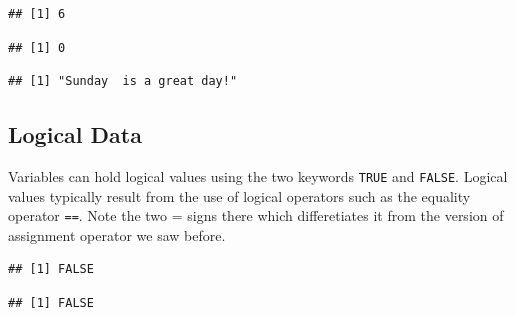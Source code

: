 \documentclass[10pt, letterpaper, twoside]{memoir}\usepackage{knitr}
\begin{document}
\begin{knitrout}
\color{fgcolor}\begin{kframe}
\begin{alltt}
\end{alltt}
\begin{verbatim}
## [1] 6
\end{verbatim}
\begin{alltt}
\end{alltt}
\begin{verbatim}
## [1] 0
\end{verbatim}
\begin{alltt}
 \hlkwb{<-}  \hlstd{)}
\end{alltt}
\begin{verbatim}
## [1] "Sunday  is a great day!"
\end{verbatim}
\end{kframe}
\end{knitrout}

\subsection{Logical Data}

Variables can hold logical values using the two keywords \texttt{TRUE} and \texttt{FALSE}.  Logical values typically result from the use of logical operators such as the equality operator \texttt{==}. Note the two = signs there which differetiates it from the version of assignment operator we saw before.

\begin{knitrout}
\color{fgcolor}\begin{kframe}
\begin{alltt}
 \hlopt{==}   
\end{alltt}
\begin{verbatim}
## [1] FALSE
\end{verbatim}
\begin{alltt}
 \hlopt{==}   
\end{alltt}
\begin{verbatim}
## [1] FALSE
\end{verbatim}
\end{kframe}
\end{knitrout}
\end{document}
